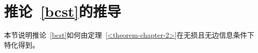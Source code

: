 %
%

\section{推论~\ref{bcst}的推导}\label{<corollary-derivation>}
本节说明推论~\ref{bcst}如何由定理~\ref{<theorem-chapter-2>}在无损且无边信息条件下特化得到。

